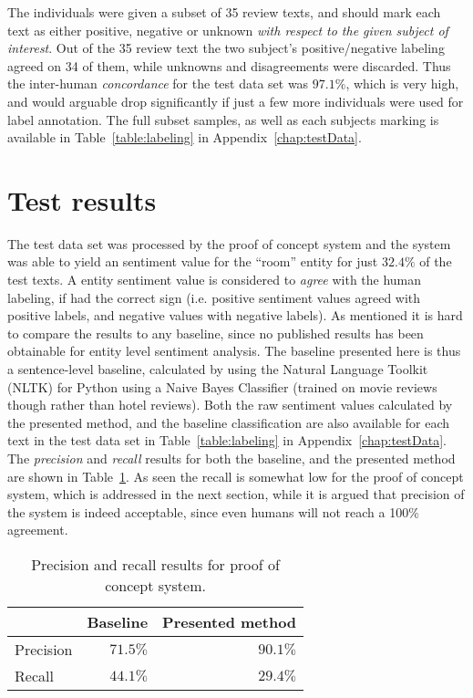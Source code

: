 The individuals were given a subset of 35 review texts, and should mark each text as either positive, negative or unknown \emph{with respect to the given subject of interest}. Out of the 35 review text the two subject's positive/negative labeling agreed on 34 of them, while unknowns and disagreements were discarded. Thus the inter-human \emph{concordance} for the test data set was $97.1\%$, which is very high, and would arguable drop significantly if just a few more individuals were used for label annotation. The full subset samples, as well as each subjects marking is available in Table~\ref{table:labeling} in Appendix~\ref{chap:testData}.

\section{Test results}
The test data set was processed by the proof of concept system and the system was able to yield an sentiment value for the ``room'' entity for just $32.4\%$ of the test texts. A entity sentiment value is considered to \emph{agree} with the human labeling, if had the correct sign (i.e. positive sentiment values agreed with positive labels, and negative values with negative labels). As mentioned it is hard to compare the results to any baseline, since no published results has been obtainable for entity level sentiment analysis. The baseline presented here is thus a sentence-level baseline, calculated by using the Natural Language Toolkit (NLTK) for Python using a Naive Bayes Classifier (trained on movie reviews though rather than hotel reviews). Both the raw sentiment values calculated by the presented method, and the baseline classification are also available for each text in the test data set in Table~\ref{table:labeling} in Appendix~\ref{chap:testData}. The \emph{precision} and \emph{recall} results for both the baseline, and the presented method are shown in Table~\ref{table:results}. As seen the recall is somewhat low for the proof of concept system, which is addressed in the next section, while it is argued that precision of the system is indeed acceptable, since even humans will not reach a 100\% agreement.
\begin{table}[ht]
\center
\begin{tabular}{l|rr}
	          & Baseline & Presented method \\ \hline
	Precision & $71.5\%$ & $90.1\%$ \\
	Recall    & $44.1\%$ & $29.4\%$ 
\end{tabular}
\caption{Precision and recall results for proof of concept system.}
\label{table:results}
\end{table}

